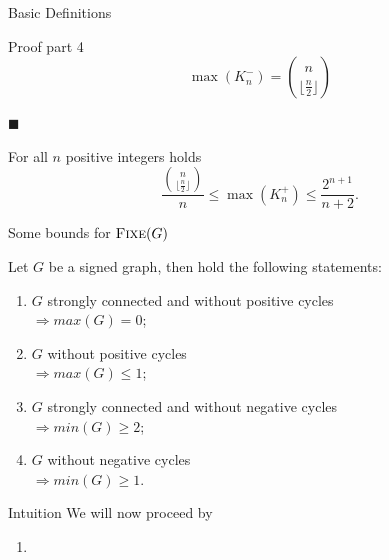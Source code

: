 \documentclass{beamer}
\newcommand{\floor}[1]{\lfloor #1 \rfloor}
\begin{document}
\begin{section}{Basic Definitions}
\begin{frame}
\begin{block} {Proof part 4}
    \[
        \max(K_n^-) = \binom{n}{\floor{\frac{n}{2}}}
    \]
    
    \hfill $\blacksquare$
\end{block}
\end{frame}
    

\begin{frame}
    \begin{theorem}[$\max(K_n^+)$]
        For all $n$ positive integers holds 
        \[
            \frac{\binom{n}{\floor{\frac{n}{2}}}}{n} \leq \max(K_n^+) \leq 
            \frac{2^{n+1}}{n+2}.
        \]
    \end{theorem}
\end{frame}
\end{section}

\begin{frame}{Some bounds for $\textsc{Fixe}(G)$}
    \begin{theorem}[Aracena 2008]
        Let $G$ be a signed graph, then hold the following statements:
        \begin{enumerate}
            \item $G$ strongly connected and without {\color{teal} positive cycles} \\
            \quad$\Rightarrow max(G) = 0$;
            \item $G$ without {\color{teal} positive cycles} \\
            \quad$\Rightarrow max(G) \leq 1$;
            \item $G$ strongly connected and without {\color{red} negative cycles} \\
            \quad$\Rightarrow min(G) \geq 2$;
            \item $G$ without {\color{red} negative cycles} \\
            \quad $\Rightarrow min(G) \geq 1$.
        \end{enumerate}
    \end{theorem}
\end{frame}

\begin{frame}{Intuition}
    We will now proceed by 
    \begin{enumerate}
        \item 
    \end{enumerate}
\end{frame}
\end{document}
